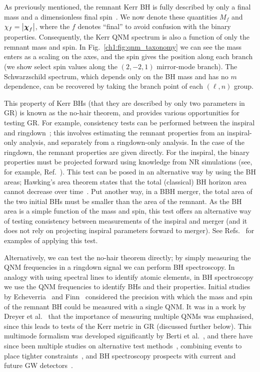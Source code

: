 As previously mentioned, the remnant Kerr BH is fully described by only a final mass and a dimensionless final spin~\cite{Carter:1971zc}.
We now denote these quantities $M_f$ and $\chi_f = \abs{\vb*{\chi}_f}$, where the $f$ denotes ``final'' to avoid confusion with the binary properties.
Consequently, the Kerr QNM spectrum is also a function of only the remnant mass and spin.
In Fig.~\ref{ch1:fig:qnm_taxonomy} we can see the mass enters as a scaling on the axes, and the spin gives the position along each branch (we show select spin values along the $(2,-2,1)$ mirror-mode branch).
The Schwarzschild spectrum, which depends only on the BH mass and has no $m$ dependence, can be recovered by taking the branch point of each $(\ell, n)$ group.

This property of Kerr BHs (that they are described by only two parameters in GR) is known as the no-hair theorem, and provides various opportunities for testing GR.
For example, consistency tests can be performed between the inspiral and ringdown~\cite{Hughes:2004vw, Nakano:2015uja, Ghosh:2016qgn, Ghosh:2017gfp}; this involves estimating the remnant properties from an inspiral-only analysis, and separately from a ringdown-only analysis.
In the case of the ringdown, the remnant properties are given directly.
For the inspiral, the binary properties must be projected forward using knowledge from NR simulations (see, for example, Ref.~\cite{Varma:2018aht}).
This test can be posed in an alternative way by using the BH areas; Hawking's area theorem states that the total (classical) BH horizon area cannot decrease over time~\cite{Hawking:1971tu}.
Put another way, in a BBH merger, the total area of the two initial BHs must be smaller than the area of the remnant. 
As the BH area is a simple function of the mass and spin, this test offers an alternative way of testing consistency between measurements of the inspiral and merger (and it does not rely on projecting inspiral parameters forward to merger).
See Refs.~\cite{Cabero:2017avf, Isi:2020tac} for examples of applying this test.

Alternatively, we can test the no-hair theorem directly; by simply measuring the QNM frequencies in a ringdown signal we can perform BH spectroscopy.
In analogy with using spectral lines to identify atomic elements, in BH spectroscopy we use the QNM frequencies to identify BHs and their properties.
Initial studies by Echeverria~\cite{Echeverria:1989hg} and Finn~\cite{Finn:1992wt} considered the precision with which the mass and spin of the remnant BH could be measured with a single QNM.
It was in a work by Dreyer et al.~\cite{Dreyer:2003bv} that the importance of measuring multiple QNMs was emphasised, since this leads to tests of the Kerr metric in GR (discussed further below).
This multimode formalism was developed significantly by Berti et al.~\cite{Berti:2005ys, Berti:2007zu}, and there have since been multiple studies on alternative test methods~\cite{Kamaretsos:2011um, Gossan:2011ha}, combining events to place tighter constraints~\cite{Meidam:2014jpa, Yang:2017zxs, DaSilvaCosta:2017njq, Carullo:2018sfu}, and BH spectroscopy prospects with current and future GW detectors~\cite{Berti:2016lat, Bhagwat:2016ntk, Maselli:2017kvl, Baibhav:2018rfk, Bhagwat:2019bwv, Cabero:2019zyt}.

